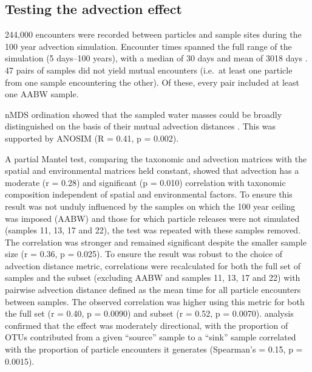 \subsection{Testing the advection effect}

244,000 encounters were recorded between particles and sample sites during the 100 year advection simulation.
Encounter times spanned the full range of the simulation (5 days--100 years), with a median of 30 days and mean of 3018 days .
47 pairs of samples did not yield mutual encounters (i.e.\ at least one particle from one sample encountering the other).
Of these, every pair included at least one AABW sample.



\ac{nMDS} ordination showed that the sampled water masses could be broadly distinguished on the basis of their mutual advection distances .
This was supported by \ac{ANOSIM} (R = 0.41, p = 0.002).



A partial Mantel test, comparing the taxonomic and advection matrices with the spatial and environmental matrices held constant, showed that advection has a moderate (r = 0.28) and significant (p = 0.010) correlation with taxonomic composition independent of spatial and environmental factors.
To ensure this result was not unduly influenced by the samples on which the 100 year ceiling was imposed (\ac{AABW}) and those for which particle releases were not simulated (samples 11, 13, 17 and 22), the test was repeated with these samples removed.
The correlation was stronger and remained significant despite the smaller sample size (r = 0.36, p = 0.025).
To ensure the result was robust to the choice of advection distance metric, correlations were recalculated for both the full set of samples and the subset (excluding \ac{AABW} and samples 11, 13, 17 and 22) with pairwise advection distance defined as the mean time for all particle encounters between samples.
The observed correlation was higher using this metric for both the full set (r = 0.40, p = 0.0090) and subset (r = 0.52, p = 0.0070).
 analysis confirmed that the effect was moderately directional, with the proportion of \acp{OTU} contributed from a given ``source'' sample to a ``sink'' sample correlated with the proportion of particle encounters it generates (Spearman's \textrho{} = 0.15, p = 0.0015). 

